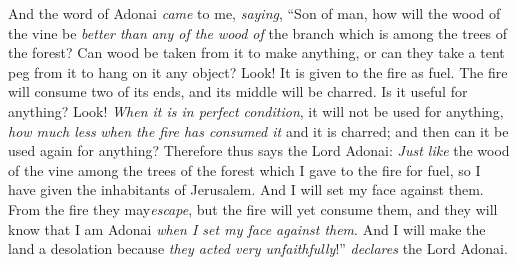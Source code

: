 \begin{biblechapter} %
 And the word of Adonai \textit{came} to me, \textit{saying},
\verse “Son of man, how will the wood of the vine be \textit{better than} \textit{any of the wood of} the branch which is among the trees of the forest?
\verse Can wood be taken from it to make anything, or can they take a tent peg from it to hang on it any object?
\verse Look! It is given to the fire as fuel. The fire will consume two of its ends, and its middle will be charred. Is it useful for anything?
\verse Look! \textit{When it is in perfect condition}, it will not be used for anything, \textit{how much less} \textit{when the fire has consumed it} and it is charred; and then can it be used again for anything?
\verse Therefore thus says the Lord Adonai: \textit{Just like} the wood of the vine among the trees of the forest which I gave to the fire for fuel, so I have given the inhabitants of Jerusalem.
\verse And I will set my face against them. From the fire they may\textit{escape}, but the fire will yet consume them, and they will know that I am Adonai \textit{when I set my face against them}.
\verse And I will make the land a desolation because \textit{they acted very unfaithfully}!” \textit{declares} the Lord Adonai.
\end{biblechapter}

